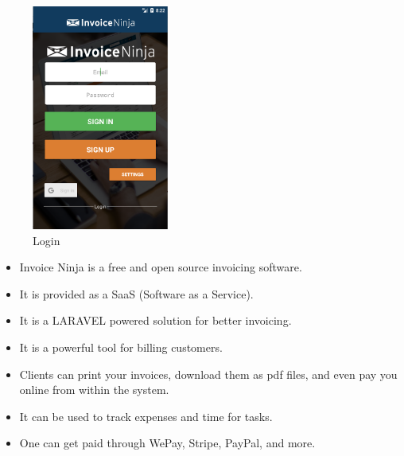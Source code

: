\begin{figure}[h!]
\centering
\includegraphics[width=0.4\textwidth]{images/4.png}                   
\caption{Login}
\hspace{-1.5em}
\end{figure}
\begin{itemize}
\item Invoice Ninja is a free and open source invoicing software.
\item It is provided as a SaaS (Software as a Service). 
\item It is a LARAVEL powered solution for better invoicing.
\item It is a powerful tool for billing customers.
\item Clients can print your invoices, download them as pdf files, and even pay you online from within the system.
\item It can be used to track expenses and time for tasks.
\item One can get paid through WePay, Stripe, PayPal, and more.
\end{itemize}
\newpage

